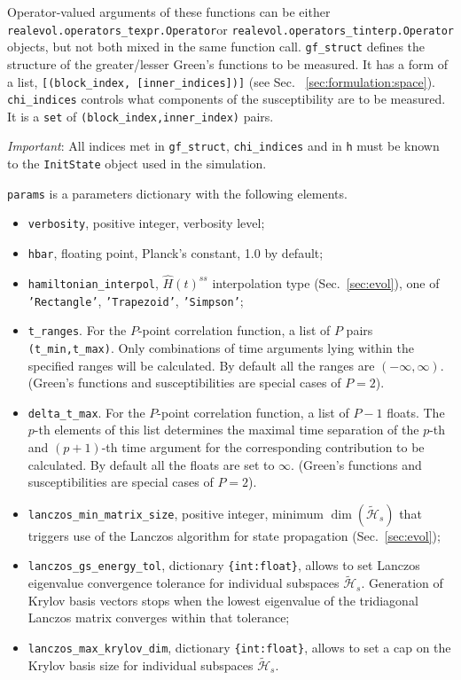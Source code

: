 \documentclass[]{article}
\begin{document}
Operator-valued arguments of these functions can be either \texttt{realevol.operators\_texpr.Operator}\linebreak or
 \texttt{realevol.operators\_tinterp.Operator} objects, but not both mixed in the same function call. \texttt{gf\_struct} defines the structure of the greater/lesser Green's functions to be measured. It has a form of a list, \texttt{[(block\_index, [inner\_indices])]} (see Sec.~ \ref{sec:formulation:space}). \texttt{chi\_indices} controls what components of the susceptibility are to be measured. It is a \texttt{set} of
\texttt{(block\_index,inner\_index)} pairs.

{\it Important}: All indices met in \texttt{gf\_struct}, \texttt{chi\_indices} and in \texttt{h} must be known to the \texttt{InitState} object used in the simulation.

\texttt{params} is a parameters dictionary with the following elements.
\begin{itemize}
    \item \texttt{verbosity}, positive integer, verbosity level;
    \item \texttt{hbar}, floating point, Planck's constant, 1.0 by default;
    \item \texttt{hamiltonian\_interpol}, $\hat H(t)^{ss}$ interpolation type (Sec.~\ref{sec:evol}), one of \texttt{'Rectangle'}, \texttt{'Trapezoid'}, \texttt{'Simpson'};
    \item \texttt{t\_ranges}. For the $P$-point correlation function, a list of $P$ pairs \texttt{(t\_min,t\_max)}. Only combinations of time arguments lying within the specified ranges will be calculated. By default all the ranges are $(-\infty,\infty)$. (Green's functions and susceptibilities are special cases of $P = 2$).
    \item \texttt{delta\_t\_max}. For the $P$-point correlation function, a list of $P-1$ floats. The $p$-th elements of this list determines the maximal time separation of the $p$-th and $(p+1)$-th time argument for the corresponding contribution to be calculated. By default all the floats are set to $\infty$. (Green's functions and susceptibilities are special cases of $P = 2$).
    \item \texttt{lanczos\_min\_matrix\_size}, positive integer, minimum $\dim(\mathcal{\tilde H}_s)$ that triggers use of the Lanczos algorithm for state propagation (Sec.~\ref{sec:evol});
    \item \texttt{lanczos\_gs\_energy\_tol}, dictionary \texttt{\{int:float\}}, allows to set Lanczos eigenvalue convergence tolerance for individual subspaces $\mathcal{\tilde H}_s$. Generation of Krylov basis vectors stops when the lowest eigenvalue of the tridiagonal Lanczos matrix converges within that tolerance;
    \item \texttt{lanczos\_max\_krylov\_dim}, dictionary \texttt{\{int:float\}}, allows to set a cap on the Krylov basis size for individual subspaces $\mathcal{\tilde H}_s$.
\end{itemize}
\end{document}
